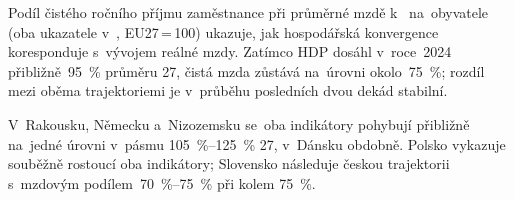 Podíl čistého ročního příjmu zaměstnance při průměrné mzdě k~ na~obyvatele (oba ukazatele v~, \acs{EU}27\,=\,100) ukazuje, jak hospodářská konvergence  koresponduje s~vývojem reálné mzdy. Zatímco \ac{HDP}  dosáhl v~roce~2024 přibližně~\SI{95}{\percent} průměru 27, čistá mzda zůstává na~úrovni okolo~\SI{75}{\percent}; rozdíl mezi oběma trajektoriemi je v~průběhu posledních dvou dekád stabilní.

V~Rakousku, Německu a~Nizozemsku se~oba indikátory pohybují přibližně na~jedné úrovni v~pásmu \SIrange{105}{125}{\percent} 27, v~Dánsku obdobně. Polsko vykazuje souběžně rostoucí oba indikátory; Slovensko následuje českou trajektorii s~mzdovým podílem~\SIrange{70}{75}{\percent} při  kolem \SI{75}{\percent}.



